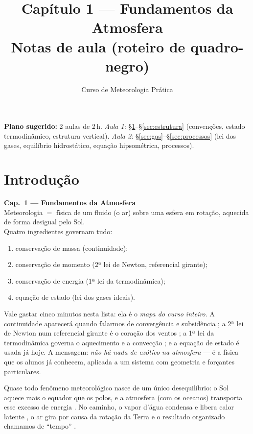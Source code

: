 \documentclass[11pt]{article}
\title{Capítulo 1 --- Fundamentos da Atmosfera\\
{\large Notas de aula (roteiro de quadro-negro)}}
\author{Curso de Meteorologia Prática}
\date{}
\begin{document}
\maketitle
\thispagestyle{fancy}

\noindent\textbf{Plano sugerido:} 2 aulas de 2\,h.
\emph{Aula 1:} \S\ref{sec:intro}--\S\ref{sec:estrutura} (convenções, estado termodinâmico, estrutura vertical).
\emph{Aula 2:} \S\ref{sec:gas}--\S\ref{sec:processos} (lei dos gases, equilíbrio hidrostático, equação hipsométrica, processos).

\section{Introdução}\label{sec:intro}

\begin{noquadro}
\textbf{Cap.~1 --- Fundamentos da Atmosfera}\\[2pt]
Meteorologia $=$ física de um fluido (o ar) sobre uma esfera em rotação,
aquecida de forma desigual pelo Sol.\\[4pt]
Quatro ingredientes governam tudo:
\begin{enumerate}[itemsep=0pt,topsep=2pt]
  \item conservação de massa (continuidade);
  \item conservação de momento (2ª lei de Newton, referencial girante);
  \item conservação de energia (1ª lei da termodinâmica);
  \item equação de estado (lei dos gases ideais).
\end{enumerate}
\end{noquadro}

Vale gastar cinco minutos nesta lista: ela é o \emph{mapa do curso inteiro}.
A continuidade aparecerá quando falarmos de convergência e subsidência
; a 2ª lei de Newton num referencial girante é o
coração dos ventos ; a 1ª lei da termodinâmica
governa o aquecimento e a convecção ; e a equação
de estado é usada já hoje. A mensagem: \emph{não há nada de exótico na
atmosfera} — é a física que os alunos já conhecem, aplicada a um sistema com
geometria e forçantes particulares.

Quase todo fenômeno meteorológico nasce de um único desequilíbrio: o Sol
aquece mais o equador que os polos, e a atmosfera (com os oceanos) transporta
esse excesso de energia . No caminho, o vapor
d'água condensa e libera calor latente 
, o ar gira por causa da rotação da Terra
 e o resultado organizado chamamos de ``tempo''
.
\end{document}
